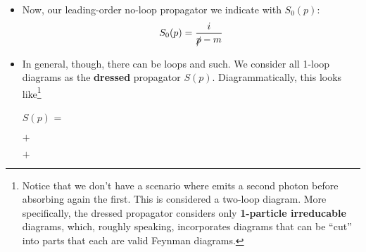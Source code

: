 \begin{itemize}
    \item Now, our leading-order no-loop propagator we indicate with $S_0(p)$:
        \begin{equation}
            S_0(p) = \frac{i}{\slashed{p} - m}
        \end{equation}
    \item In general, though, there can be loops and such. We consider all 1-loop diagrams as the \textbf{dressed} propagator $S(p)$. Diagrammatically, this looks like\footnote{Notice that we don't have a scenario where emits a second photon before absorbing again the first. This is considered a two-loop diagram. More specifically, the dressed propagator considers only \textbf{1-particle irreducable} diagrams, which, roughly speaking, incorporates diagrams that can be ``cut'' into parts that each are valid Feynman diagrams.}
        \begin{center}
            $S(p)$ = 
            $+$ 
            $+$
\end{center}
\end{itemize}
